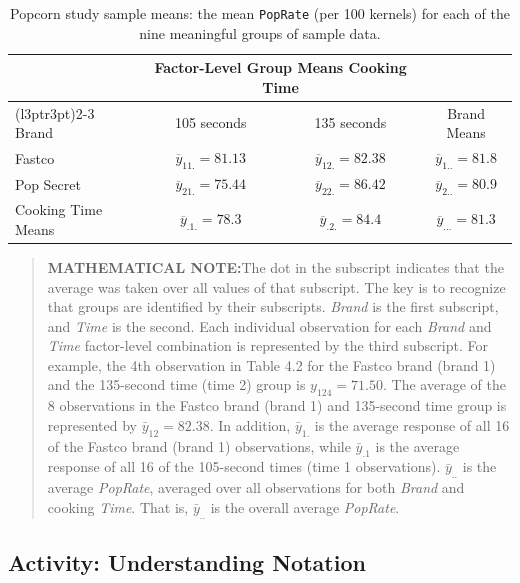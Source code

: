 \documentclass[
]{book}
\begin{document}
\begin{table}[!h]
\centering
\caption{\label{tab:tab43} Popcorn study sample means: the mean \texttt{PopRate} (per 100 kernels) for each of the nine meaningful groups of sample data.}
\centering
\begin{tabular}[t]{lccc}
\toprule
\multicolumn{1}{c}{ } & \multicolumn{2}{c}{Factor-Level Group Means Cooking Time} & \multicolumn{1}{c}{ } \\
\cmidrule(l{3pt}r{3pt}){2-3}
Brand & 105 seconds & 135 seconds & Brand Means\\
\midrule
Fastco & $\overline{y}_{11.} = 81.13$ & $\overline{y}_{12.} = 82.38$ & $\overline{y}_{1..} = 81.8$\\
Pop Secret & $\overline{y}_{21.} = 75.44$ & $\overline{y}_{22.} = 86.42$ & $\overline{y}_{2..} = 80.9$\\
Cooking Time Means & $\overline{y}_{.1.} = 78.3$ & $\overline{y}_{.2.} = 84.4$ & $\overline{y}_{...} = 81.3$\\
\bottomrule
\end{tabular}
\end{table}

\begin{quote}
\textbf{MATHEMATICAL NOTE:}The dot in the subscript indicates that the average was taken over all values of that subscript. The key is to recognize that groups are identified by their subscripts. \emph{Brand} is the first subscript, and \emph{Time} is the second. Each individual observation for each \emph{Brand} and \emph{Time} factor-level combination is represented by the third subscript. For example, the 4th observation in Table 4.2 for the Fastco brand (brand 1) and the 135-second time (time 2) group is \(y_{124} = 71.50\). The average of the 8 observations in the Fastco brand (brand 1) and 135-second time group is represented by \(\bar{y}_{12} = 82.38\). In addition, \(\bar{y}_{1.}\) is the average response of all 16 of the Fastco brand (brand 1) observations, while \(\bar{y}_{.1}\) is the average response of all 16 of the 105-second times (time 1 observations). \(\bar{y}_{..}\) is the average \emph{PopRate}, averaged over all observations for both \emph{Brand} and cooking \emph{Time}. That is, \(\bar{y}_{..}\) is the overall average \emph{PopRate}.
\end{quote}

\hypertarget{activity-understanding-notation}{%
\subsection*{Activity: Understanding Notation}\label{activity-understanding-notation}}
\end{document}
